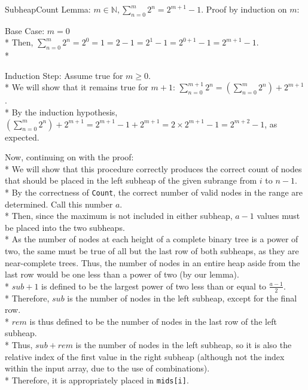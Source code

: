 \documentclass[letterpaper, reqno, 11pt]{article}
\newcommand{\NN}{\mathbb{N}}
\begin{document}
\begin{description}
	\item{SubheapCount}
	Lemma: \forall $m\in\NN, \sum_{n=0}^m2^n=2^{m+1}-1$.
	Proof by induction on $m$:
	\begin{description}
		\item{Base Case:} $m=0$\\*
		Then, $\sum_{n=0}^m2^n=2^0=1=2-1=2^{1}-1=2^{0+1}-1=2^{m+1}-1$.\\*
		\item{Induction Step:} Assume true for $m\geq0$.\\*
		We will show that it remains true for $m+1$:
		$\sum_{n=0}^{m+1}2^n=\left(\sum_{n=0}^{m}2^n\right)+2^{m+1}$.\\*
		By the induction hypothesis,
		$\left(\sum_{n=0}^{m}2^n\right)+2^{m+1}=2^{m+1}-1+2^{m+1}=2\times2^{m+1}-1=2^{m+2}-1$,
		as expected.
	\end{description}
	Now, continuing on with the proof:\\*
	We will show that this procedure correctly produces the correct count
	of nodes that should be placed in the left subheap of the given subrange from $i$ to $n-1$.\\*
	By the correctness of \verb|Count|, the correct number of valid nodes in the range are determined.
	Call this number $a$.\\*
	Then, since the maximum is not included in either subheap, $a-1$ values must be placed into the
	two subheaps.\\*
	As the number of nodes at each height of a complete binary tree is a power of two, the same must be
	true of all but the last row of both subheaps, as they are near-complete trees.
	Thus, the number of nodes in an entire heap aside from the last row would be
	one less than a power of two (by our lemma).\\*
	$sub+1$ is defined to be the largest power of two less than or equal to $\frac{a-1}{2}$.\\*
	Therefore, $sub$ is the number of nodes in the left subheap, except for the final row.\\*
	$rem$ is thus defined to be the number of nodes in the last row of the left subheap.\\*
	Thus, $sub+rem$ is the number of nodes in the left subheap, so it is also the relative index
	of the first value in the right subheap (although not the index within the input array, due
	to the use of combinations).\\*
	Therefore, it is appropriately placed in \verb|mids[i]|.


\end{description}
\end{document}

